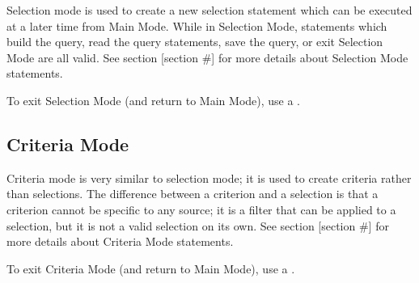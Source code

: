 Selection mode is used to create a new selection statement which can be executed at a later time from Main Mode.
While in Selection Mode, statements which build the query, read the query statements, save the query, or exit
Selection Mode are all valid. See section [section \#] for more details about Selection Mode statements.

To exit Selection Mode (and return to Main Mode), use a .

\subsection{Criteria Mode}
Criteria mode is very similar to selection mode; it is used to create criteria rather than selections.
The difference between a criterion and a selection is that a criterion cannot be specific to any source;
it is a filter that can be applied to a selection, but it is not a valid selection on its own.
See section [section \#] for more details about Criteria Mode statements.

To exit Criteria Mode (and return to Main Mode), use a .
